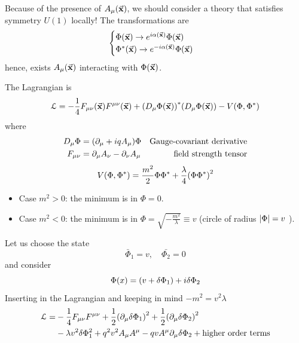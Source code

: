 \documentclass[../main/main.tex]{subfiles}
\begin{document}
\begin{remark}
Because of the presence of \( A _ \mu (\va{x}) \), we should consider a theory that satisfies symmetry \( U(1) \) locally!
The transformations are
\begin{equation}
  \begin{cases}
   \Phi  ( \va{x} ) \rightarrow e^{i \alpha (\va{x})} \Phi (\va{x}) \\
  \Phi^*  ( \va{x} ) \rightarrow e^{-i \alpha (\va{x})} \Phi (\va{x})
  \end{cases}
\end{equation}
hence, exists \( A _ \mu (\va{x}) \) interacting with \( \Phi (\va{x}) \).

The Lagrangian is
\begin{equation}
  \mathcal{L} = - \frac{1}{4} F_ {\mu  \nu } (\va{x}) F ^{ \mu \nu } (\va{x})
  + \qty(D _ \mu  \Phi (\va{x}))^* \qty(D _ \mu \Phi (\va{x}))
  - V (\Phi ,\Phi ^*)
\end{equation}
where
\begin{subequations}
\begin{align}
  D_ \mu \Phi  &= \qty(\partial_ \mu  + i q A _ \mu  ) \Phi   & \text{Gauge-covariant derivative}\\
  F_ { \mu \nu } &= \partial_ \mu  A _ \nu  - \partial _ \nu  A _ \mu & \text{field strength tensor}
\end{align}
\end{subequations}
\begin{equation}
  V (\Phi , \Phi ^*) = \frac{m^2}{2} \Phi \Phi ^* + \frac{\lambda }{4} \qty(\Phi \Phi ^*)^2
\end{equation}
\begin{itemize}
\item Case \( m^2 >0 \): the minimum is in \( \Phi =0 \).
\item Case \( m^2 < 0 \): the minimum is in \( \Phi = \sqrt{- \frac{m^2}{\lambda }} \equiv v  \)    (circle of radius \( \abs{\Phi } = v \) ).
\end{itemize}
\end{remark}
Let us choose the state
\begin{equation}
  \bar{\Phi }_1 = v , \quad \bar{\Phi _2} = 0
\end{equation}
and consider
\begin{equation}
  \Phi (x) = \qty(v + \delta \Phi _1) + i \delta \Phi _2
\end{equation}
Inserting in the Lagrangian and keeping in mind \( - m^2 = v^2 \lambda  \)
\begin{equation}
\begin{split}
  \mathcal{L} = & - \frac{1}{4} F_ {\mu \nu }F ^{\mu \nu } + \frac{1}{2} \qty(\partial_ \mu \delta \Phi _1 )^2 + \frac{1}{2} \qty(\partial _ \mu \delta \Phi _2 )^2    \\
  & - \lambda v^2 \delta \Phi _1 ^2 + q^2 v^2 A_{\mu } A ^{\mu } - q v A ^{\mu } \partial_ \mu \delta \Phi _2 + \text{higher order terms}
\end{split}
\end{equation}
\end{document}
